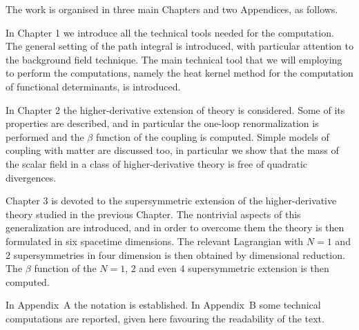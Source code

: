 \vspace{1.5em}


The work is organised in three main Chapters and two Appendices, as follows.



In Chapter 1 we introduce all the technical tools needed for the computation. The general setting of the path integral is introduced, with particular attention to the background field technique. The main technical tool that we will employing to perform the computations, namely the heat kernel method for the computation of functional determinants, is introduced.



In Chapter 2 the higher-derivative extension of \ym{} theory is considered. Some of its properties are described, and in particular the one-loop renormalization is performed and the $\beta$ function of the \ym{} coupling is computed. Simple models of coupling with matter are discussed too, in particular we show that the mass of the scalar field in a class of higher-derivative theory is free of quadratic divergences. 




Chapter 3 is devoted to the supersymmetric extension of the higher-derivative \ym{} theory studied in the previous Chapter. The nontrivial aspects of this generalization are introduced, and in order to overcome them the theory is then formulated in six spacetime dimensions. The relevant Lagrangian with $N=1$ and $2$ supersymmetries in four dimension is then obtained by dimensional reduction. The $\beta$ function of the $N=1$, $2$ and even $4$ supersymmetric extension is then computed.%



In Appendix~A the notation is established.  In Appendix~B some technical computations are reported, given here favouring the readability of the text.






